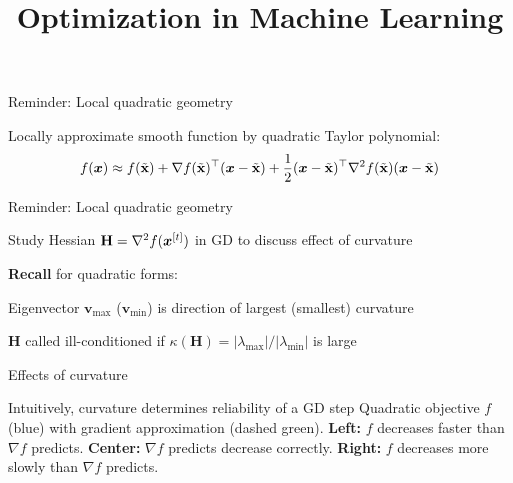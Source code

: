 \documentclass[11pt,compress,t,notes=noshow, xcolor=table]{beamer}
\title{Optimization in Machine Learning}
\begin{document}

\begin{framei}{Reminder: Local quadratic geometry}
\item Locally approximate smooth function by quadratic Taylor polynomial:
$$f(\bm{x}) \approx f(\tilde{\mathbf{x}}) + \nabla f(\tilde{\mathbf{x}})^\top(\bm{x}-\tilde{\mathbf{x}}) +
\frac 12(\bm{x}-\tilde{\mathbf{x}})^\top\nabla^2 f(\tilde{\mathbf{x}})(\bm{x}-\tilde{\mathbf{x}})$$
\end{framei}


\begin{framei}{Reminder: Local quadratic geometry}
\item Study Hessian $\mathbf{H} = \nabla^2 f(\bm{x}^{[t]})$ in GD to discuss effect of curvature
\item \textbf{Recall} for quadratic forms:
\begin{itemizeM}
\item Eigenvector $\textbf{v}_\text{max}$ ($\textbf{v}_\text{min}$) is direction of largest (smallest) curvature
\item $\mathbf{H}$ called ill-conditioned if $\kappa(\mathbf{H}) = |\lambda_\text{max}| / |\lambda_\text{min}|$ is large
\end{itemizeM}
\vfill
{}
\end{framei}


\begin{framei}{Effects of curvature}
\item Intuitively, curvature determines reliability of a GD step
\centering\small
Quadratic objective $f$ (blue) with gradient approximation (dashed green). \textbf{Left:} $f$ decreases faster than $\nabla f$ predicts. \textbf{Center:} $\nabla f$ predicts decrease correctly. \textbf{Right:} $f$ decreases more slowly than $\nabla f$ predicts.
\end{framei}
\end{document}
